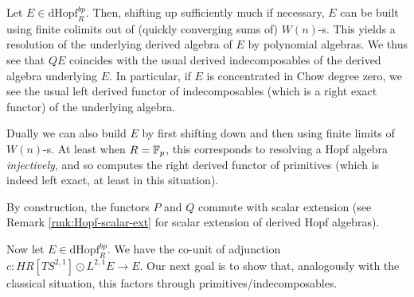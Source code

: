 \documentclass{amsart}
\numberwithin{proposition}{section}
\numberwithin{equation}{section}
\def\dHopf{\mathrm{dHopf}}
\def\hotimes{\odot}
\def\hLoops{L}
\begin{document}
\begin{remark} \label{rmk:P-Q-explanation}
Let $E \in \dHopf_R^{bp}$.
Then, shifting up sufficiently much if necessary, $E$ can be built using finite colimits out of (quickly converging sums of) $W(n)$-s.
This yields a resolution of the underlying derived algebra of $E$ by polynomial algebras.
We thus see that $QE$ coincides with the usual derived indecomposables of the derived algebra underlying $E$.
In particular, if $E$ is concentrated in Chow degree zero, we see the usual left derived functor of indecomposables (which is a right exact functor) of the underlying algebra.

Dually we can also build $E$ by first shifting down and then using finite limits of $W(n)$-s.
At least when $R = \mathbb{F}_p$, this corresponds to resolving a Hopf algebra \emph{injectively}, and so computes the right derived functor of primitives (which is indeed left exact, at least in this situation).
\end{remark}

\begin{remark} \label{rmk:P-Q-compatible-scalar-ext}
By construction, the functors $P$ and $Q$ commute with scalar extension (see Remark \ref{rmk:Hopf-scalar-ext} for scalar extension of derived Hopf algebras).
\end{remark}

Now let $E \in \dHopf_R^{bp}$.
We have the co-unit of adjunction $c: HR[TS^{2,1}] \hotimes\hLoops^{2,1}E \to E$.
Our next goal is to show that, analogously with the classical situation, this factors through primitives/indecomposables.
\end{document}
